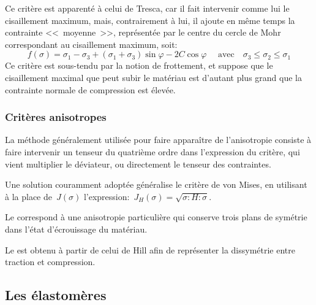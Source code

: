 Ce critère
est apparenté à celui de Tresca,
car il fait intervenir comme lui le cisaillement maximum, mais, contrairement à lui, il ajoute en même temps
la contrainte <<~moyenne~>>, représentée par le centre du cercle de Mohr correspondant au cisaillement
maximum, soit:
\begin{equation} f(\sigma) = \sigma_1 - \sigma_3 + (\sigma_1 + \sigma_3) \sin\varphi - 2C\cos \varphi \quad
\text{ avec} \quad \sigma_3 \le \sigma_2 \le \sigma_1 \end{equation}
Ce critère est sous-tendu par la notion de frottement, et suppose que le cisaillement maximal que peut
subir le matériau est d'autant plus grand que la contrainte normale de compression est élevée.

\medskip
\subsubsection{Critères anisotropes}

La méthode généralement utilisée pour faire apparaître de l'anisotropie consiste à faire intervenir
un tenseur du quatrième ordre dans l'expression du critère, qui vient multiplier le déviateur, ou directement
le tenseur des contraintes.

Une solution couramment adoptée généralise le critère de von Mises, en utilisant à la place de~$J(\sigma)$
l'expression:~$J_H(\sigma) = \sqrt{\sigma: H: \sigma}$.

\medskip
Le 
correspond à une anisotropie particulière qui conserve trois plans de symétrie dans l'état d'écrouissage du
matériau.

\medskip
Le 
est obtenu à partir de celui de Hill afin de représenter la dissymétrie entre traction et compression.







\medskip
\subsection{Les élastomères}

